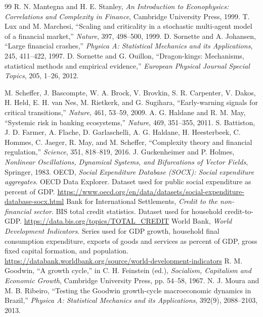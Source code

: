 \documentclass[11pt]{article}
\begin{document}
\begin{thebibliography}{99}
 R. N. Mantegna and H. E. Stanley, \emph{An Introduction to Econophysics: Correlations and Complexity in Finance}, Cambridge University Press, 1999.
 T. Lux and M. Marchesi, ``Scaling and criticality in a stochastic multi-agent model of a financial market,'' \emph{Nature}, 397, 498--500, 1999.
 D. Sornette and A. Johansen, ``Large financial crashes,'' \emph{Physica A: Statistical Mechanics and its Applications}, 245, 411--422, 1997.
 D. Sornette and G. Ouillon, ``Dragon-kings: Mechanisms, statistical methods and empirical evidence,'' \emph{European Physical Journal Special Topics}, 205, 1--26, 2012.

 M. Scheffer, J. Bascompte, W. A. Brock, V. Brovkin, S. R. Carpenter, V. Dakos, H. Held, E. H. van Nes, M. Rietkerk, and G. Sugihara, ``Early-warning signals for critical transitions,'' \emph{Nature}, 461, 53--59, 2009.
 A. G. Haldane and R. M. May, ``Systemic risk in banking ecosystems,'' \emph{Nature}, 469, 351--355, 2011.
 S. Battiston, J. D. Farmer, A. Flache, D. Garlaschelli, A. G. Haldane, H. Heesterbeek, C. Hommes, C. Jaeger, R. May, and M. Scheffer, ``Complexity theory and financial regulation,'' \emph{Science}, 351, 818--819, 2016.
 J. Guckenheimer and P. Holmes, \emph{Nonlinear Oscillations, Dynamical Systems, and Bifurcations of Vector Fields}, Springer, 1983.
 OECD, \emph{Social Expenditure Database (SOCX): Social expenditure aggregates}. OECD Data Explorer. Dataset used for public social expenditure as percent of GDP. \url{https://www.oecd.org/en/data/datasets/social-expenditure-database-socx.html}
 Bank for International Settlements, \emph{Credit to the non-financial sector}. BIS total credit statistics. Dataset used for household credit-to-GDP. \url{https://data.bis.org/topics/TOTAL_CREDIT}
 World Bank, \emph{World Development Indicators}. Series used for GDP growth, household final consumption expenditure, exports of goods and services as percent of GDP, gross fixed capital formation, and population. \url{https://databank.worldbank.org/source/world-development-indicators}
 R. M. Goodwin, ``A growth cycle,'' in C. H. Feinstein (ed.), \emph{Socialism, Capitalism and Economic Growth}, Cambridge University Press, pp. 54--58, 1967.
 N. J. Moura and M. B. Ribeiro, ``Testing the Goodwin growth-cycle macroeconomic dynamics in Brazil,'' \emph{Physica A: Statistical Mechanics and its Applications}, 392(9), 2088--2103, 2013.

\end{thebibliography}
\end{document}
